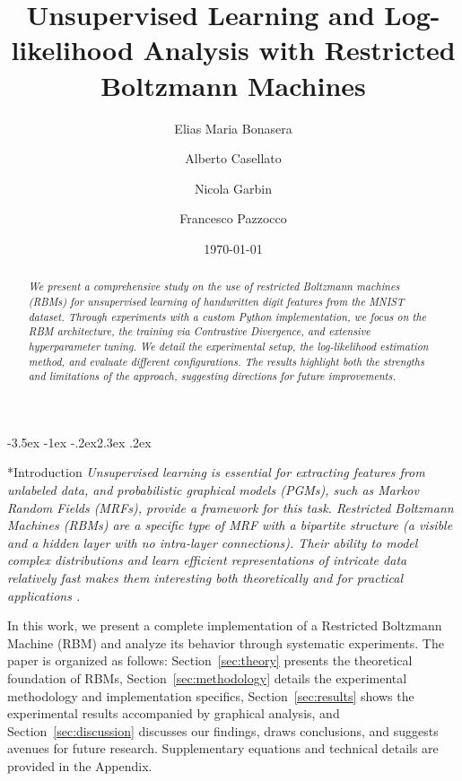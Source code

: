 \documentclass[prl,twocolumn]{revtex4-1}
\makeatletter
\renewcommand{\section}{\@startsection{section}{1}{\z@}%
    {-3.5ex \@plus -1ex \@minus -.2ex}{2.3ex \@plus.2ex}%
    {\normalfont\bfseries\raggedright}}
\makeatother
\begin{document}
\setcounter{secnumdepth}{1}

\title{Unsupervised Learning and Log-likelihood Analysis with Restricted Boltzmann Machines}

\author{Elias Maria Bonasera}
\author{Alberto Casellato}
\author{Nicola Garbin}
\author{Francesco Pazzocco}

\date{\today}

\begin{abstract}
\textit{We present a comprehensive study on the use of restricted Boltzmann machines (RBMs) for unsupervised learning of handwritten digit features from the MNIST dataset. Through experiments with a custom Python implementation, we focus on the RBM architecture, the training via Contrastive Divergence, and extensive hyperparameter tuning. We detail the experimental setup, the log-likelihood estimation method, and evaluate different configurations. The results highlight both the strengths and limitations of the approach, suggesting directions for future improvements.}
\end{abstract}

\maketitle

\section*{Introduction}
\textit{Unsupervised learning is essential for extracting features from unlabeled data, and probabilistic graphical models (PGMs), such as Markov Random Fields (MRFs), provide a framework for this task. Restricted Boltzmann Machines (RBMs) are a specific type of MRF with a bipartite structure (a visible and a hidden layer with no intra-layer connections). Their ability to model complex distributions and learn efficient representations of intricate data relatively fast makes them interesting both theoretically and for practical applications \cite{intro_ML,bortoletto, practical}.}

In this work, we present a complete implementation of a Restricted Boltzmann Machine (RBM) and analyze its behavior through systematic experiments. The paper is organized as follows:
Section~\ref{sec:theory} presents the theoretical foundation of RBMs, Section~\ref{sec:methodology} details the experimental methodology and implementation specifics, Section~\ref{sec:results} shows the experimental results accompanied by graphical analysis, and Section~\ref{sec:discussion} discusses our findings, draws conclusions, and suggests avenues for future research. Supplementary equations and technical details are provided in the Appendix.
\end{document}
